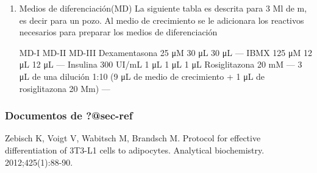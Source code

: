 \documentclass[
  spanish,
  12pt,
  a4paper,
]{article}
\begin{document}
\begin{enumerate}
\def\labelenumi{\alph{enumi})}
\setcounter{enumi}{1}
\item
  Medios de diferenciación(MD) La siguiente tabla es descrita para 3 Ml
  de m, es decir para un pozo. Al medio de crecimiento se le adicionara
  los reactivos necesarios para preparar los medios de diferenciación

  MD-I MD-II MD-III Dexamentasona 25 μM 30 μL 30 μL --- IBMX 125 μM 12
  μL 12 μL --- Insulina 300 UI/mL 1 μL 1 μL 1 μL Rosiglitazona 20 mM ---
  3 μL de una dilución 1:10 (9 μL de medio de crecimiento + 1 μL de
  rosiglitazona 20 Mm) ---
\end{enumerate}

\subsubsection{\texorpdfstring{Documentos de
\textbf{?@sec-ref}}{Documentos de ?@sec-ref}}\label{documentos-de--sec-ref}

Zebisch K, Voigt V, Wabitsch M, Brandsch M. Protocol for effective
differentiation of 3T3-L1 cells to adipocytes. Analytical biochemistry.
2012;425(1):88-90.


\printbibliography[title=References]
\end{document}
